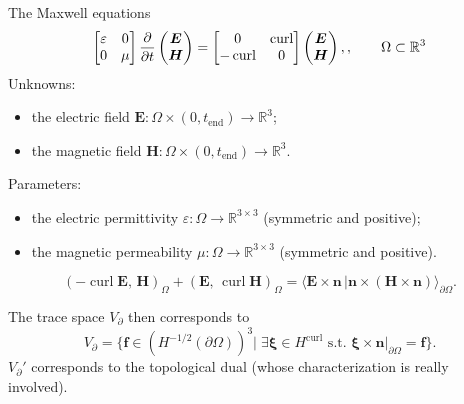 \documentclass[aspectratio=169]{beamer}
\DeclareMathOperator*{\curl}{curl}
\newcommand{\bbR}{\mathbb{R}}
\newcommand{\inner}[3][]{\ensuremath{( #2, \, #3 )_{#1}}}
\newcommand{\dualpr}[3][]{\ensuremath{\langle #2 \, \vert #3 \rangle_{#1}}}
\begin{document}
\begin{frame}{The Maxwell equations}
	\begin{equation*}
		\begin{bmatrix}
			\varepsilon & 0 \\
			0 & \mu
		\end{bmatrix}\diffp{}{t}\begin{pmatrix}
			\bm{E} \\ \bm{H} 
		\end{pmatrix} = 
		\begin{bmatrix}
			0 & \curl \\
			-\curl & 0 \\
		\end{bmatrix}\begin{pmatrix}
			\bm{E} \\ \bm{H}
		\end{pmatrix}, , \qquad \Omega \subset \bbR^3
	\end{equation*}
	Unknowns:
\begin{itemize}
	\item the electric field $\bm{E} : \Omega \times (0, t_{\mathrm{end}}) \rightarrow \bbR^3$;
	\item the magnetic field $\bm{H} : \Omega \times (0, t_{\mathrm{end}}) \rightarrow \bbR^3$.
\end{itemize}
Parameters:
\begin{itemize}
	\item the electric permittivity $\varepsilon: \Omega \rightarrow \bbR^{3\times 3}$ (symmetric and positive);
	\item the magnetic permeability $\mu:\Omega \rightarrow \bbR^{3\times 3}$ (symmetric and positive).
\end{itemize}
	\begin{equation*}
		\inner[\Omega]{-\curl \bm{E}}{\bm{H}} + \inner[\Omega]{\bm{E}}{\curl \bm{H}} = \dualpr[\partial\Omega]{\bm{E} \times \bm{n}}{\bm{n} \times (\bm{H} \times \bm{n})}.
	\end{equation*}

	The trace space $V_\partial$ then corresponds to
	\begin{equation*}
		V_\partial = \{\bm{f} \in (H^{-1/2}(\partial\Omega))^3 \vert \; \exists \bm{\xi} \in H^{\curl} \text{ s.t. } \bm{\xi}\times \bm{n}\vert_{\partial\Omega} = \bm{f}\}.
	\end{equation*}
	$V_\partial'$ corresponds to the topological dual (whose characterization is really involved). 
\end{frame}
\end{document}
